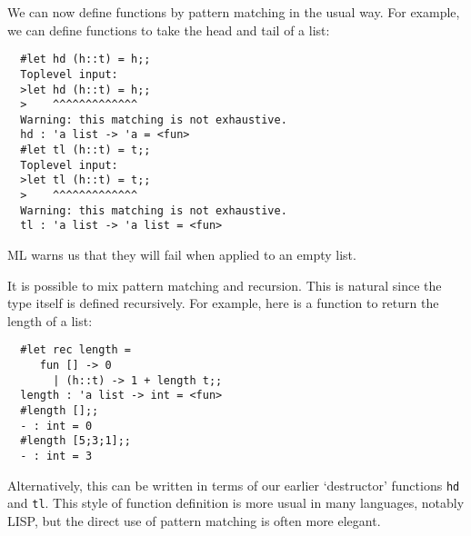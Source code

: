 \begin{slide*}


\vspace*{0.5cm}

We can now define functions by pattern matching in the usual way. For example,
we can define functions to take the head and tail of a list:

\begin{black}\begin{verbatim}
  #let hd (h::t) = h;;
  Toplevel input:
  >let hd (h::t) = h;;
  >    ^^^^^^^^^^^^^
  Warning: this matching is not exhaustive.
  hd : 'a list -> 'a = <fun>
  #let tl (h::t) = t;;
  Toplevel input:
  >let tl (h::t) = t;;
  >    ^^^^^^^^^^^^^
  Warning: this matching is not exhaustive.
  tl : 'a list -> 'a list = <fun>
\end{verbatim}\end{black}

ML warns us that they will fail when applied to an empty list.

\end{slide*}



\begin{slide*}


\vspace*{0.5cm}

It is possible to mix pattern matching and recursion. This is natural since the
type itself is defined recursively. For example, here is a
function to return the length of a list:

\begin{black}\begin{verbatim}
  #let rec length =
     fun [] -> 0
       | (h::t) -> 1 + length t;;
  length : 'a list -> int = <fun>
  #length [];;
  - : int = 0
  #length [5;3;1];;
  - : int = 3
\end{verbatim}\end{black}

Alternatively, this can be written in terms of our earlier `destructor'
functions {\black \tt hd} and {\black \tt tl}. This style of function definition is more
usual in many languages, notably LISP, but the direct use of pattern matching
is often more elegant.

\end{slide*}




